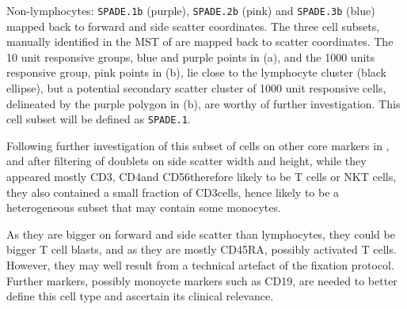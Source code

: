 {
 Non-lymphocytes: \texttt{SPADE.1b} (purple), \texttt{SPADE.2b} (pink) and \texttt{SPADE.3b} (blue) mapped back to forward and side scatter coordinates.
}
{
 The three cell subsets, manually identified in the \gls{MST} of  are mapped back to scatter coordinates.
 The 10 unit responsive groups, blue and purple points in (a), and the 1000 units responsive group, pink points in (b), lie close to the lymphocyte cluster (black ellipse), but a potential secondary scatter cluster of 1000 unit responsive cells, delineated by the purple polygon in (b), are worthy of further investigation.
 This cell subset will be defined as \texttt{SPADE.1}.
}

Following further investigation of this subset of cells on other core markers in , and after filtering of doublets on side scatter width and height, while they appeared mostly CD3\positive, CD4\positive and CD56\negative therefore likely to be T cells or NKT cells, they also contained a small fraction of CD3\negative cells, hence likely to be a heterogeneous subset that may contain some monocytes.

As they are bigger on forward and side scatter than lymphocytes, they could be bigger T cell blasts, and as they are mostly CD45RA\positive,
possibly activated T cells.
However, they may well result from a technical artefact of the fixation protocol.
Further markers, possibly monoycte markers such as CD19, are needed to better define this cell type and ascertain its clinical relevance.

